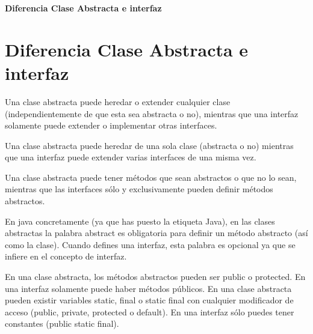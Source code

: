 
\begin{Large}
\begin{center}
\textbf{Diferencia Clase Abstracta e interfaz} \\
\end{center}
\end{Large}

\section{Diferencia Clase Abstracta e interfaz} 
Una clase abstracta puede heredar o extender cualquier clase (independientemente de que esta sea abstracta o no), mientras que una interfaz solamente puede extender o implementar otras interfaces.


Una clase abstracta puede heredar de una sola clase (abstracta o no) mientras que una interfaz puede extender varias interfaces de una misma vez.

Una clase abstracta puede tener métodos que sean abstractos o que no lo sean, mientras que las interfaces sólo y exclusivamente pueden definir métodos abstractos.

En java concretamente (ya que has puesto la etiqueta Java), en las clases abstractas la palabra abstract es obligatoria para definir un método abstracto (así como la clase). Cuando defines una interfaz, esta palabra es opcional ya que se infiere en el concepto de interfaz.

En una clase abstracta, los métodos abstractos pueden ser public o protected. En una interfaz solamente puede haber métodos públicos.
En una clase abstracta pueden existir variables static, final o static final con cualquier modificador de acceso (public, private, protected o default).
En una interfaz sólo puedes tener constantes (public static final).

